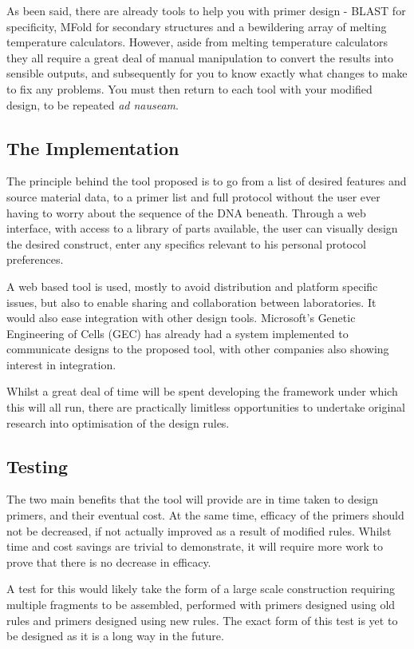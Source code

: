\documentclass[../main.tex]{subfiles}
\begin{document}
As been said, there are already tools to help you with primer design - BLAST for specificity, MFold for secondary structures and a bewildering array of melting temperature calculators. However, aside from melting temperature calculators they all require a great deal of manual manipulation to convert the results into sensible outputs, and subsequently for you to know exactly what changes to make to fix any problems. You must then return to each tool with your modified design, to be repeated \emph{ad nauseam}.

\subsection{The Implementation}

The principle behind the tool proposed is to go from a list of desired features and source material data, to a primer list and full protocol without the user ever having to worry about the sequence of the DNA beneath. Through a web interface, with access to a library of parts available, the user can visually design the desired construct, enter any specifics relevant to his personal protocol preferences.

A web based tool is used, mostly to avoid distribution and platform specific issues, but also to enable sharing and collaboration between laboratories. It would also ease integration with other design tools. Microsoft's Genetic Engineering of Cells (GEC) has already had a system implemented to communicate designs to the proposed tool, with other companies also showing interest in integration.

Whilst a great deal of time will be spent developing the framework under which this will all run, there are practically limitless opportunities to undertake original research into optimisation of the design rules.

\subsection{Testing}

The two main benefits that the tool will provide are in time taken to design primers, and their eventual cost. At the same time, efficacy of the primers should not be decreased, if not actually improved as a result of modified rules. Whilst time and cost savings are trivial to demonstrate, it will require more work to prove that there is no decrease in efficacy.

A test for this would likely take the form of a large scale construction requiring multiple fragments to be assembled, performed with primers designed using old rules and primers designed using new rules. The exact form of this test is yet to be designed as it is a long way in the future.
\end{document}
